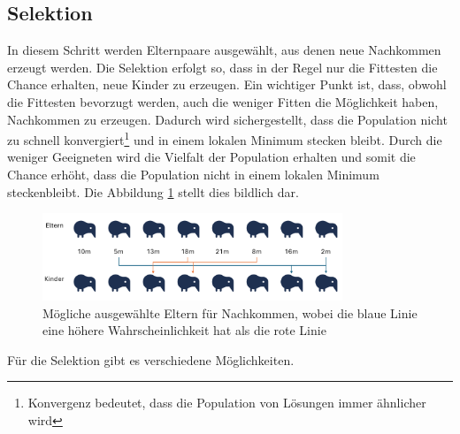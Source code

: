 %
%
%
%
\subsection{Selektion
\label{buch:paper:varalg:subsection:selection}}
In diesem Schritt werden Elternpaare ausgewählt, aus denen neue 
Nachkommen erzeugt werden. Die Selektion erfolgt so, dass in der 
Regel nur die Fittesten die Chance erhalten, neue Kinder zu erzeugen. 
Ein wichtiger Punkt ist, dass, obwohl die Fittesten bevorzugt werden, 
auch die weniger Fitten die Möglichkeit haben, Nachkommen zu erzeugen. 
Dadurch wird sichergestellt, dass die Population nicht zu schnell 
konvergiert\footnote{
    Konvergenz bedeutet, dass die Population von Lösungen immer ähnlicher wird
    }
und in einem lokalen Minimum stecken bleibt. Durch die weniger Geeigneten 
wird die Vielfalt der Population erhalten und somit die Chance erhöht, 
dass die Population nicht in einem lokalen Minimum steckenbleibt. Die Abbildung
\ref{fig:selection_of_parents} stellt dies bildlich dar.
\begin{figure}
    \centering
    \includegraphics[width=0.8\textwidth]{
        papers/varalg/images/teil3/04OffspringProbability.png
    }
    \caption{
        Mögliche ausgewählte Eltern für Nachkommen, wobei die blaue Linie 
        eine höhere Wahrscheinlichkeit hat als die rote Linie}
    \label{fig:selection_of_parents}
\end{figure}
Für die Selektion gibt es verschiedene Möglichkeiten.
